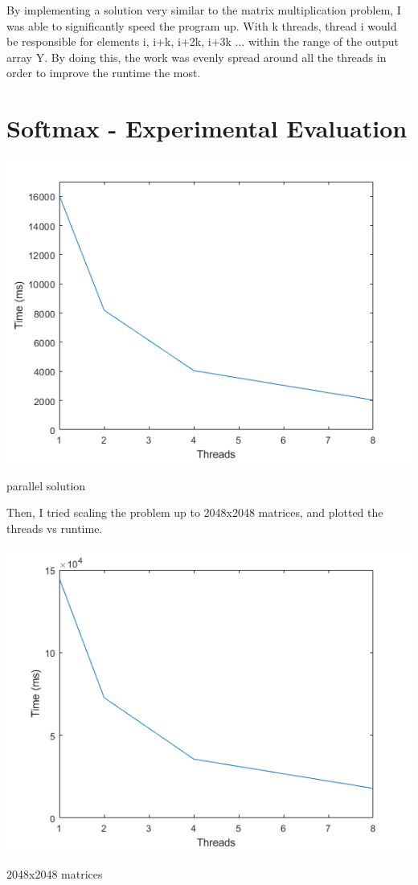 \documentclass[a4paper]{article}
\begin{document}
By implementing a solution very similar to the matrix multiplication problem, I was able to significantly speed the program up. With k threads, thread i would be responsible for elements i, i+k, i+2k, i+3k ... within the range of the output array Y. By doing this, the work was evenly spread around all the threads in order to improve the runtime the most.

\section{Softmax - Experimental Evaluation}

\begin{center}
    \includegraphics[scale=1]{7a.png}
    \caption{parallel solution}
\end{center}

\noindent
Then, I tried scaling the problem up to 2048x2048 matrices, and plotted the threads vs runtime.

\begin{center}
    \includegraphics[scale=1]{7b.png}
    \caption{2048x2048 matrices}
\end{center}
\end{document}
